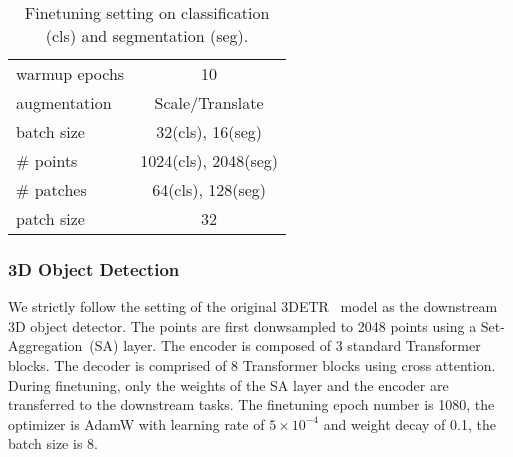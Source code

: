 \documentclass[runningheads]{llncs}
\begin{document}
\begin{table}[t!]
{\begin{tabular}[t]{l|c}
        warmup epochs & 10 \\
        augmentation & Scale/Translate \\
        batch size & 32(cls), 16(seg) \\
        \# points & 1024(cls), 2048(seg) \\
        \# patches & 64(cls), 128(seg) \\
        patch size & 32 \\
    \end{tabular}
    \vspace{3pt}
    \caption{Finetuning setting on classification (cls) and segmentation (seg).}
    \label{tab:finetuning}
}
\vspace{-20pt}
\end{table}

\subsubsection{3D Object Detection}
We strictly follow the setting of the original 3DETR~\cite{misra2021-3detr} model as the downstream 3D object detector. The points are first donwsampled to 2048 points using a Set-Aggregation~(SA) layer. The encoder is composed of 3 standard Transformer blocks. The decoder is comprised of 8 Transformer blocks using cross attention. During finetuning, only the weights of the SA layer and the encoder are transferred to the downstream tasks.  The finetuning epoch number is 1080, the optimizer is AdamW with learning rate of $5\times10^{-4}$ and weight decay of 0.1, the batch size is 8. 
 


\end{document}
